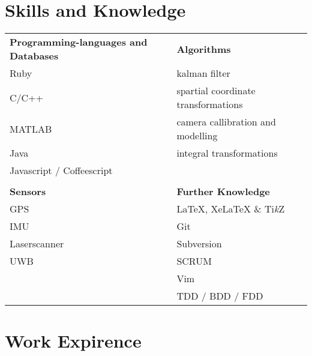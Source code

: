 \documentclass[a4paper,10pt]{article} %
\begin{document}
 
\section{Skills and Knowledge}
 
\begin{tabular}{ll}
  \textbf{Programming-languages and Databases} & \textbf{Algorithms}\\
Ruby                                           & kalman filter \\
C/C++                                          & spartial coordinate transformations \\ 
MATLAB                                         & camera callibration and modelling \\ 
Java                                           & integral transformations  \\ 
Javascript / Coffeescript                      & \\ 
                                               & \\ 
\textbf{Sensors}                               & \textbf{Further Knowledge }\\
GPS                                            & LaTeX, XeLaTeX \& Ti\textit{k}Z\\ 
IMU                                            & Git \\ 
Laserscanner                                   & Subversion \\ 
UWB                                            & SCRUM \\ 
                                               & Vim \\
                                               & TDD / BDD / FDD 
\end{tabular}
 
 
\section{Work Expirence}
 
\end{document}
